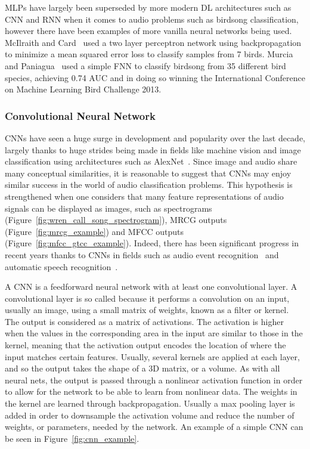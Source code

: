 MLPs have largely been superseded by more modern DL architectures such as CNN and
RNN when it comes to audio problems such as birdsong classification, however
there have been examples of more vanilla neural networks being used. McIlraith
and Card~\cite{mcilraith1997birdsong} used a two layer perceptron network using
backpropagation to minimize a mean squared error loss to classify samples from 7
birds. Murcia and Paniagua~\cite{murcia2013bird} used a simple FNN to classify
birdsong from 35 different bird species, achieving 0.74 AUC and in doing so
winning the International Conference on Machine Learning Bird Challenge 2013.

\subsubsection{Convolutional Neural Network}

CNNs have seen a huge surge in development and popularity over the last decade,
largely thanks to huge strides being made in fields like machine vision and
image classification using architectures such as
AlexNet~\cite{krizhevsky2012imagenet}. Since image and audio share many
conceptual similarities, it is reasonable to suggest that CNNs may enjoy similar
success in the world of audio classification problems. This hypothesis is
strengthened when one considers that many feature representations of audio
signals can be displayed as images, such as spectrograms
(Figure~\ref{fig:wren_call_song_spectrogram}), MRCG outputs
(Figure~\ref{fig:mrcg_example}) and MFCC outputs
(Figure~\ref{fig:mfcc_gtcc_example}). Indeed, there has been significant
progress in recent years thanks to CNNs in fields such as audio event
recognition~\cite{takahashi2017aenet} and automatic speech
recognition~\cite{sercu2016very}.

A CNN is a feedforward neural network with at least one convolutional layer. A
convolutional layer is so called because it performs a convolution on an input,
usually an image, using a small matrix of weights, known as a filter or kernel.
The output is considered as a matrix of activations. The activation is higher
when the values in the corresponding area in the input are similar to those in
the kernel, meaning that the activation output encodes the location of where the
input matches certain features. Usually, several kernels are applied at each
layer, and so the output takes the shape of a 3D matrix, or a volume. As with
all neural nets, the output is passed through a nonlinear activation function in
order to allow for the network to be able to learn from nonlinear data. The
weights in the kernel are learned through backpropagation. Usually a max
pooling layer is added in order to downsample the activation volume and reduce
the number of weights, or parameters, needed by the network. An example of a
simple CNN can be seen in Figure~\ref{fig:cnn_example}.

